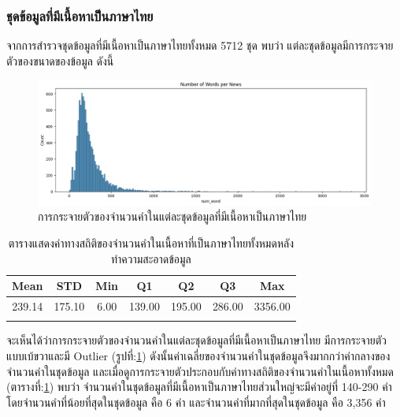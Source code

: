\documentclass[12pt,oneside,openright,a4paper]{cpe-thai-project}
\begin{document}
\begin{itemize}
      \subsubsection{ชุดข้อมูลที่มีเนื้อหาเป็นภาษาไทย}
        \hspace{1cm}จากการสำรวจชุดข้อมูลที่มีเนื้อหาเป็นภาษาไทยทั้งหมด 5712 ชุด พบว่า แต่ละชุดข้อมูลมีการกระจายตัวของขนาดของข้อมูล \newline ดังนี้
        \begin{figure}[!ht]\centering
          \includegraphics[width=\textwidth]{./img/thai_stat/hist_all_word.png}
          \caption{การกระจายตัวของจำนวนคำในแต่ละชุดข้อมูลที่มีเนื้อหาเป็นภาษาไทย}\label{fig:thai_hist}
        \end{figure}
        \begin{longtable}[!ht]{ccccccc}
          \caption{ตารางแสดงค่าทางสถิติของจำนวนคำในเนื้อหาที่เป็นภาษาไทยทั้งหมดหลังทำความสะอาดข้อมูล}
          \label{tbl:thai_stat_all}\\
          \hhline{=======}
          \textbf{Mean} & \textbf{STD} & \textbf{Min} & \textbf{Q1} & \textbf{Q2} & \textbf{Q3} & \textbf{Max}\\ \hline
          \endhead
          239.14 & 175.10 & 6.00 & 139.00 & 195.00 & 286.00 & 3356.00  \\ \hhline{=======}%
        \end{longtable}
        \hspace{1cm}จะเห็นได้ว่าการกระจายตัวของจำนวนคำในแต่ละชุดข้อมูลที่มีเนื้อหาเป็นภาษาไทย มีการกระจายตัวแบบเบ้ขวาและมี Outlier (รูปที่:\ref{fig:thai_hist}) 
        ดังนั้นค่าเฉลี่ยของจำนวนคำในชุดข้อมูลจึงมากกว่าค่ากลางของจำนวนคำในชุดข้อมูล และเมื่อดูการกระจายตัวประกอบกับค่าทางสถิติของจำนวนคำในเนื้อหาทั้งหมด
        (ตารางที่:\ref{tbl:thai_stat_all}) พบว่า จำนวนคำในชุดข้อมูลที่มีเนื้อหาเป็นภาษาไทยส่วนใหญ่จะมีค่าอยู่ที่ 140-290 คำ โดยจำนวนคำที่น้อยที่สุดในชุดข้อมูล คือ 6 คำ
        และจำนวนคำที่มากที่สุดในชุดข้อมูล คือ 3,356 คำ
        

\end{itemize}
\end{document}
